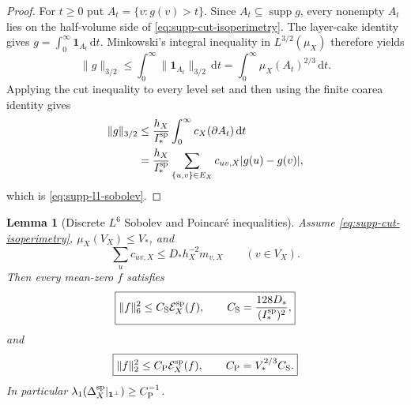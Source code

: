\documentclass[11pt]{article}
\newtheorem{lemma}[lemma]{Lemma}
\theoremstyle{definition}
\theoremstyle{remark}
\newcommand{\one}{\mathbf 1}
\newcommand{\dd}{\mathrm d}
\newcommand{\supp}{\operatorname{supp}}
\begin{document}
\begin{proof}
For $t\ge0$ put $A_t=\{v:g(v)>t\}$.  Since $A_t\subseteq\supp g$, every
nonempty $A_t$ lies on the half-volume side of
\eqref{eq:supp-cut-isoperimetry}.  The layer-cake identity gives
$g=\int_0^\infty\one_{A_t}\,\dd t$.  Minkowski's integral inequality in
$L^{3/2}(\mu_X)$ therefore yields
\begin{equation}
 \|g\|_{3/2}
 \le\int_0^\infty\|\one_{A_t}\|_{3/2}\,\dd t
 =\int_0^\infty\mu_X(A_t)^{2/3}\,\dd t.
 \label{eq:supp-layer-minkowski}
\end{equation}
Applying the cut inequality to every level set and then using the finite
coarea identity gives
\begin{align}
 \|g\|_{3/2}
 &\le \frac{h_X}{I_*^{\rm sp}}
       \int_0^\infty c_X(\partial A_t)\,\dd t \\
 &=\frac{h_X}{I_*^{\rm sp}}
   \sum_{\{u,v\}\in E_X}c_{uv,X}|g(u)-g(v)|,
\end{align}
which is \eqref{eq:supp-l1-sobolev}.
\end{proof}

\begin{lemma}[Discrete $L^6$ Sobolev and Poincar\'e inequalities]
\label{lem:supp-l6-poincare}
Assume \eqref{eq:supp-cut-isoperimetry},
$\mu_X(V_X)\le V_*$, and
\begin{equation}
 \sum_uc_{uv,X}\le D_*h_X^{-2}m_{v,X}
 \qquad(v\in V_X).
 \label{eq:supp-weighted-degree}
\end{equation}
Then every mean-zero $f$ satisfies
\begin{equation}
 \boxed{
 \|f\|_6^2\le C_{\rm S}\mathcal E_X^{\rm sp}(f),
 \qquad
 C_{\rm S}=\frac{128D_*}{(I_*^{\rm sp})^2},}
 \label{eq:supp-sobolev}
\end{equation}
and
\begin{equation}
 \boxed{
 \|f\|_2^2\le C_{\rm P}\mathcal E_X^{\rm sp}(f),
 \qquad C_{\rm P}=V_*^{2/3}C_{\rm S}.}
 \label{eq:supp-poincare}
\end{equation}
In particular
$\lambda_1(\Delta_X^{\rm sp}|_{\one^\perp})\ge C_{\rm P}^{-1}$.
\end{lemma}
\end{document}
